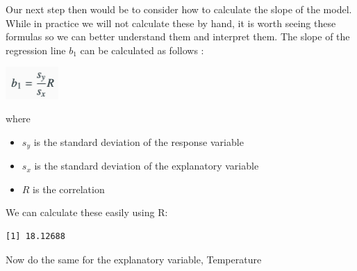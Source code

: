 \documentclass[
  letterpaper,
  DIV=11,
  numbers=noendperiod]{scrreprt}
\newenvironment{Shaded}{\begin{snugshade}}{\end{snugshade}}
\newcommand{\CommentTok}[1]{\textcolor[rgb]{0.37,0.37,0.37}{#1}}
\newcommand{\FunctionTok}[1]{\textcolor[rgb]{0.28,0.35,0.67}{#1}}
\newcommand{\NormalTok}[1]{\textcolor[rgb]{0.00,0.23,0.31}{#1}}
\newcommand{\OtherTok}[1]{\textcolor[rgb]{0.00,0.23,0.31}{#1}}
\newcommand{\SpecialCharTok}[1]{\textcolor[rgb]{0.37,0.37,0.37}{#1}}
\providecommand{\tightlist}{%
  \setlength{\itemsep}{0pt}\setlength{\parskip}{0pt}}\usepackage{longtable,booktabs,array}
\begin{document}
Our next step then would be to consider how to calculate the slope of
the model. While in practice we will not calculate these by hand, it is
worth seeing these formulas so we can better understand them and
interpret them. The slope of the regression line \(b_1\) can be
calculated as follows :

\includegraphics[width=0.15\textwidth,height=\textheight]{./images/LMR_4.jpg}

where

\begin{itemize}
\tightlist
\item
  \(s_y\) is the standard deviation of the response variable
\item
  \(s_x\) is the standard deviation of the explanatory variable
\item
  \(R\) is the correlation
\end{itemize}

We can calculate these easily using R:

\begin{Shaded}
\end{Shaded}

\begin{verbatim}
[1] 18.12688
\end{verbatim}

Now do the same for the explanatory variable, Temperature

\begin{Shaded}
\end{Shaded}
\end{document}

